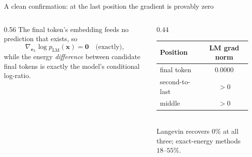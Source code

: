 \documentclass{beamer}
\begin{document}
\begin{frame}{A clean confirmation: at the last position the gradient is provably zero}
  \begin{columns}[T]
    \begin{column}{0.56\textwidth}
      \small The final token's embedding feeds no prediction that exists, so
      \[ \nabla_{\bm{e}_L}\log p_{\text{LM}}(\bm{x}) = \bm{0} \quad\text{(exactly)}, \]
      while the energy \emph{difference} between candidate final tokens is exactly the model's
      conditional log-ratio.
      \vspace{0.5em}

    \end{column}
    \begin{column}{0.44\textwidth}
      \small
      \begin{tabular}{lc}
        \toprule
        Position & LM grad norm \\
        \midrule
        final token & $0.0000$ \\
        second-to-last & $>0$ \\
        middle & $>0$ \\
        \bottomrule
      \end{tabular}
      \\[0.4em]{\scriptsize Langevin recovers $0\%$ at all three; exact-energy methods $18$--$55\%$.}
    \end{column}
  \end{columns}
\end{frame}
\end{document}

